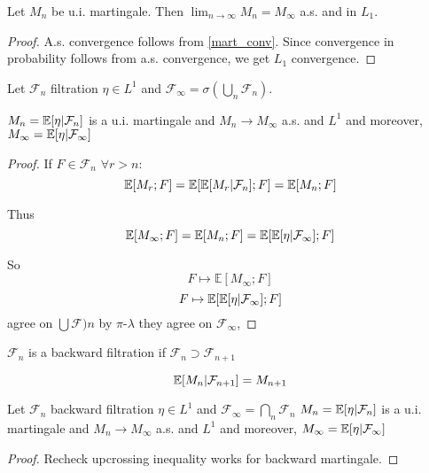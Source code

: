 \begin{theorem}
	Let $M_n$ be u.i. martingale. Then $\lim_{n\to\infty} M_n = M_\infty$ a.s. and in $L_1$.
	\begin{proof}
		A.s. convergence follows from \ref{mart_conv}. Since convergence in probability follows from a.s. convergence, we get $L_1$ convergence.
	\end{proof}
\end{theorem}

\begin{theorem}
	Let $\mathcal{F}_n$ filtration $\eta \in L^1$ and $\mathcal{F}_\infty = \sigma(\bigcup_n \mathcal{F}_n)$.
	
	$M_n = \mathbb{E} \qty[\eta | \mathcal{F}_n]$ is a u.i. martingale and 
	$M_n \to M_\infty$ a.s. and $L^1$ and moreover, $M_\infty = \mathbb{E} \qty[\eta|\mathcal{F}_\infty ]$
	
	\begin{proof}
		If $F\in \mathcal{F}_n$ $\forall r>n$:
		$$\mathbb{E} \qty[M_r ; F ] = \mathbb{E} \qty[ \mathbb{E} \qty[M_r |\mathcal{F}_n] ; F] = \mathbb{E} \qty[M_n; F]$$
		
		Thus $$\mathbb{E} [M_\infty ; F] = \mathbb{E} [M_n; F] = \mathbb{E} [\mathbb{E} \qty[\eta | \mathcal{F}_\infty]; F] $$
		
		So 
		$$F\mapsto \mathbb{E} [M_\infty ; F]$$
		$$ F\mapsto\mathbb{E} [\mathbb{E} \qty[\eta | \mathcal{F}_\infty]; F]$$
		agree on $\bigcup \mathcal{F})n$ by $\pi$-$\lambda$ they agree on $\mathcal{F}_\infty$,
	\end{proof}
\end{theorem}

\begin{definition}
	$\mathcal{F}_n$ is a backward filtration if $\mathcal{F}_n \supset \mathcal{F}_{n+1}$
\end{definition}
\begin{definition}
$$\mathbb{E} \qty[M_n | \mathcal{F}_{n+1}] = M_{n+1}$$
\end{definition}

\begin{theorem}
	Let $\mathcal{F}_n$ backward filtration $\eta \in L^1$ and $\mathcal{F}_\infty = \bigcap_n \mathcal{F}_n$
	$M_n = \mathbb{E} \qty[\eta | \mathcal{F}_n]$ is a u.i. martingale and 
	$M_n \to M_\infty$ a.s. and $L^1$ and moreover, $M_\infty = \mathbb{E} \qty[\eta|\mathcal{F}_\infty ]$
	
	\begin{proof}
		Recheck upcrossing inequality works for backward martingale.
	\end{proof}
\end{theorem}

